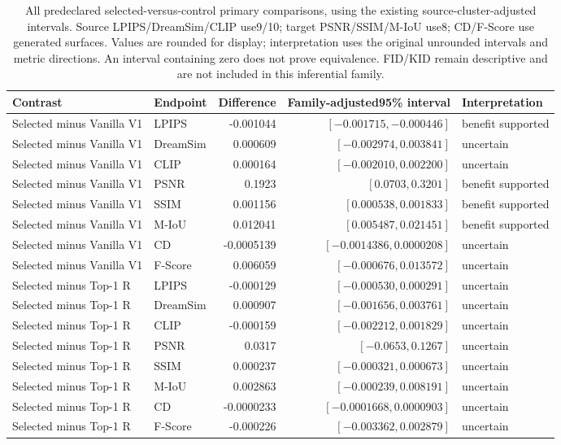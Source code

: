 \begin{table}[t]
\centering\scriptsize
\begin{tabular}{llrrl}
\toprule
Contrast&Endpoint&Difference&Family-adjusted95\% interval&Interpretation\\
\midrule
Selected minus Vanilla V1&LPIPS&-0.001044&$[-0.001715,-0.000446]$&benefit supported\\
Selected minus Vanilla V1&DreamSim&0.000609&$[-0.002974,0.003841]$&uncertain\\
Selected minus Vanilla V1&CLIP&0.000164&$[-0.002010,0.002200]$&uncertain\\
Selected minus Vanilla V1&PSNR&0.1923&$[0.0703,0.3201]$&benefit supported\\
Selected minus Vanilla V1&SSIM&0.001156&$[0.000538,0.001833]$&benefit supported\\
Selected minus Vanilla V1&M-IoU&0.012041&$[0.005487,0.021451]$&benefit supported\\
Selected minus Vanilla V1&CD&-0.0005139&$[-0.0014386,0.0000208]$&uncertain\\
Selected minus Vanilla V1&F-Score&0.006059&$[-0.000676,0.013572]$&uncertain\\
Selected minus Top-1 R&LPIPS&-0.000129&$[-0.000530,0.000291]$&uncertain\\
Selected minus Top-1 R&DreamSim&0.000907&$[-0.001656,0.003761]$&uncertain\\
Selected minus Top-1 R&CLIP&-0.000159&$[-0.002212,0.001829]$&uncertain\\
Selected minus Top-1 R&PSNR&0.0317&$[-0.0653,0.1267]$&uncertain\\
Selected minus Top-1 R&SSIM&0.000237&$[-0.000321,0.000673]$&uncertain\\
Selected minus Top-1 R&M-IoU&0.002863&$[-0.000239,0.008191]$&uncertain\\
Selected minus Top-1 R&CD&-0.0000233&$[-0.0001668,0.0000903]$&uncertain\\
Selected minus Top-1 R&F-Score&-0.000226&$[-0.003362,0.002879]$&uncertain\\
\bottomrule
\end{tabular}
\caption{All predeclared selected-versus-control primary comparisons, using the existing source-cluster-adjusted intervals. Source LPIPS/DreamSim/CLIP use9/10; target PSNR/SSIM/M-IoU use8; CD/F-Score use generated surfaces. Values are rounded for display; interpretation uses the original unrounded intervals and metric directions. An interval containing zero does not prove equivalence. FID/KID remain descriptive and are not included in this inferential family.}
\label{tab:final-adjusted-contrasts}
\end{table}

